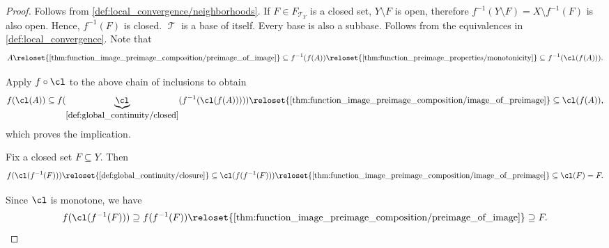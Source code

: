 \begin{proof}
   Follows from \cref{def:local_convergence/neighborhoods}.
   If \( F \in F_{\mscrT_Y} \) is a closed set, \( Y \setminus F \) is open, therefore \( f^{-1}(Y \setminus F) = X \setminus f^{-1}(F) \) is also open. Hence, \( f^{-1}(F) \) is closed.
   \( \mscrT \) is a base of itself.
   Every base is also a subbase.
   Follows from the equivalences in \cref{def:local_convergence}.
   Note that
  \begin{equation*}
    A
    \reloset {\ref{thm:function_image_preimage_composition/preimage_of_image}} \subseteq
    f^{-1}(f(A))
    \reloset {\ref{thm:function_preimage_properties/monotonicity}} \subseteq
    f^{-1}(\cl(f(A))).
  \end{equation*}

  Apply \( f \circ \cl \) to the above chain of inclusions to obtain
  \begin{equation*}
    f(\cl(A))
    \subseteq
    f(\underbrace{\cl}_{\ref{def:global_continuity/closed}}(f^{-1}(\cl(f(A)))))
    \reloset {\ref{thm:function_image_preimage_composition/image_of_preimage}} \subseteq
    \cl(f(A)),
  \end{equation*}
  which proves the implication.

   Fix a closed set \( F \subseteq Y \). Then
  \begin{equation}\label{def:global_continuity/closure_implies_closed_right}
    f(\cl(f^{-1}(F)))
    \reloset {\ref{def:global_continuity/closure}} \subseteq
    \cl(f(f^{-1}(F)))
    \reloset {\ref{thm:function_image_preimage_composition/image_of_preimage}} \subseteq
    \cl(F)
    =
    F.
  \end{equation}

  Since \( \cl \) is monotone, we have
  \begin{equation}\label{def:global_continuity/closure_implies_closed_left}
    f(\cl(f^{-1}(F)))
    \supseteq
    f(f^{-1}(F))
    \reloset {\ref{thm:function_image_preimage_composition/preimage_of_image}} \supseteq
    F.
  \end{equation}


\end{proof}
